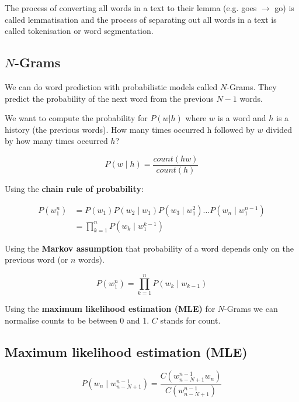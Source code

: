 The process of converting all words in a text to their lemma (e.g. goes $\to$ go) is called lemmatisation and the process of separating out all words in a text is called tokenisation or word segmentation.


\subsection*{$N$-Grams}

We can do word prediction with probabilistic models called $N$-Grams. They predict the probability of the next word from the previous $N-1$ words.

We want to compute the probability for $P(w|h)$ where $w$ is a word and $h$ is a history (the previous words). How many times occurred h followed by $w$ divided by how many times occurred $h$?

\begin{equation}
  P(w \mid h) = \frac{count(hw)}{count(h)}
  \label{eq:Probwh}
\end{equation}

Using the \textbf{chain rule of probability}:

\begin{equation}
  \begin{split}
  P(w_1^n) &= P(w_1)P(w_2 \mid w_1)P(w_3 \mid w_1^2 ) \ldots P(w_n \mid w_1^{n-1})\\
  &= \prod_{k=1}^{n}P(w_k \mid w_1^{k-1})
  \end{split}
  \label{eq:Probw1n}
\end{equation}

Using the \textbf{Markov assumption} that probability of a word depends only on the previous word (or $n$ words).

\begin{equation}
  P(w_1^n) = \prod_{k=1}^{n}P(w_k \mid w_{k-1})
  \label{eq:Probw1n2}
\end{equation}

Using the \textbf{maximum likelihood estimation (MLE)} for $N$-Grams we can normalise counts to be between 0 and 1. $C$ stands for count.


\subsection*{Maximum likelihood estimation (MLE)}

\begin{equation}
  P(w_n \mid w_{n-N+1}^{n-1}) = \frac{C(w_{n-N+1}^{n-1} w_n)}{C(w_{n-N+1}^{n-1})}
  \label{eq:Probwn}
\end{equation}

